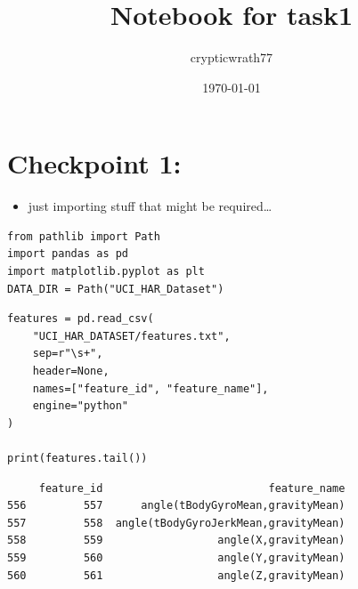 \documentclass[11pt]{article}
\author{crypticwrath77}
\date{\today}
\title{Notebook for task1}
\begin{document}
\maketitle
\tableofcontents

\section{Checkpoint 1:}
\label{sec:org95f34b0}
\begin{itemize}
\item just importing stuff that might be required\ldots{}
\end{itemize}

\begin{verbatim}
from pathlib import Path
import pandas as pd
import matplotlib.pyplot as plt
DATA_DIR = Path("UCI_HAR_Dataset")
\end{verbatim}

\begin{verbatim}
features = pd.read_csv(
    "UCI_HAR_DATASET/features.txt",
    sep=r"\s+",
    header=None,
    names=["feature_id", "feature_name"],
    engine="python"
)

print(features.tail())
\end{verbatim}

\begin{verbatim}
     feature_id                          feature_name
556         557      angle(tBodyGyroMean,gravityMean)
557         558  angle(tBodyGyroJerkMean,gravityMean)
558         559                  angle(X,gravityMean)
559         560                  angle(Y,gravityMean)
560         561                  angle(Z,gravityMean)
\end{verbatim}
\end{document}

